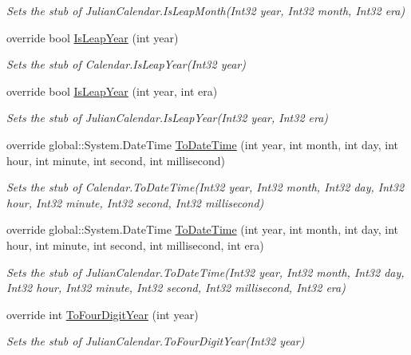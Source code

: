 \begin{DoxyCompactItemize}
\begin{DoxyCompactList}\small\item\em Sets the stub of Julian\-Calendar.\-Is\-Leap\-Month(\-Int32 year, Int32 month, Int32 era)\end{DoxyCompactList}\item 
override bool \hyperlink{class_system_1_1_globalization_1_1_fakes_1_1_stub_julian_calendar_a0ab84af00148015b519575330d832dbf}{Is\-Leap\-Year} (int year)
\begin{DoxyCompactList}\small\item\em Sets the stub of Calendar.\-Is\-Leap\-Year(\-Int32 year)\end{DoxyCompactList}\item 
override bool \hyperlink{class_system_1_1_globalization_1_1_fakes_1_1_stub_julian_calendar_a741dfd61830b0aeae416965a43eb25fb}{Is\-Leap\-Year} (int year, int era)
\begin{DoxyCompactList}\small\item\em Sets the stub of Julian\-Calendar.\-Is\-Leap\-Year(\-Int32 year, Int32 era)\end{DoxyCompactList}\item 
override global\-::\-System.\-Date\-Time \hyperlink{class_system_1_1_globalization_1_1_fakes_1_1_stub_julian_calendar_af7a0232718737609a70088446beab1b3}{To\-Date\-Time} (int year, int month, int day, int hour, int minute, int second, int millisecond)
\begin{DoxyCompactList}\small\item\em Sets the stub of Calendar.\-To\-Date\-Time(\-Int32 year, Int32 month, Int32 day, Int32 hour, Int32 minute, Int32 second, Int32 millisecond)\end{DoxyCompactList}\item 
override global\-::\-System.\-Date\-Time \hyperlink{class_system_1_1_globalization_1_1_fakes_1_1_stub_julian_calendar_a055a7b0de6ba0da4d657587c4ded92d9}{To\-Date\-Time} (int year, int month, int day, int hour, int minute, int second, int millisecond, int era)
\begin{DoxyCompactList}\small\item\em Sets the stub of Julian\-Calendar.\-To\-Date\-Time(\-Int32 year, Int32 month, Int32 day, Int32 hour, Int32 minute, Int32 second, Int32 millisecond, Int32 era)\end{DoxyCompactList}\item 
override int \hyperlink{class_system_1_1_globalization_1_1_fakes_1_1_stub_julian_calendar_a6ed40136455282c3480c548c7a45c736}{To\-Four\-Digit\-Year} (int year)
\begin{DoxyCompactList}\small\item\em Sets the stub of Julian\-Calendar.\-To\-Four\-Digit\-Year(\-Int32 year)\end{DoxyCompactList}\end{DoxyCompactItemize}
